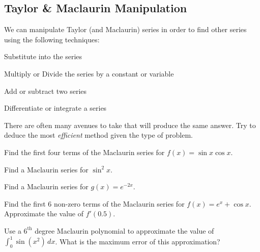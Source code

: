\documentclass[addpoints, 12pt]{exam}
\begin{document}
\subsection*{Taylor \& Maclaurin Manipulation}
We can manipulate Taylor (and Maclaurin) series in order to find other series using the following techniques:
\begin{itemize}
    \begin{minipage}[t]{0.45\linewidth}
    \item Substitute into the series
    \end{minipage}
    \hfill 
    \begin{minipage}[t]{0.45\linewidth}
    \item Multiply or Divide the series by a constant or variable
    \end{minipage}
    
    \begin{minipage}[t]{0.45\linewidth}
    \item Add or subtract two series
    \end{minipage}
    \hfill
    \begin{minipage}[t]{0.45\linewidth}
    \item Differentiate or integrate a series
    \end{minipage}
    
\end{itemize}

There are often many avenues to take that will produce the same answer. Try to deduce the most \textit{efficient} method given the type of problem.
\begin{questions}

    \question Find the first four terms of the Maclaurin series for $f(x)=\sin x\cos x$.
    
    
    \newpage
    
    \begin{minipage}[t]{0.45\linewidth}
        \question Find a Maclaurin series for $\sin^2 x$.
    \end{minipage}
    \hfill
    \begin{minipage}[t]{0.45\linewidth}
        \question Find a Maclaurin series for $g(x)=e^{-2x}$.
    \end{minipage}
    
    
    \question Find the first 6 non-zero terms of the Maclaurin series for $f(x)=e^x+\cos x$. Approximate the value of $f'(0.5)$.
    
    \question Use a $6^{\text{th}}$ degree Maclaurin polynomial to approximate the value of $\displaystyle\int_0^1 \sin(x^2)\,dx$. What is the maximum error of this approximation?
    
    
\end{questions}
\end{document}

